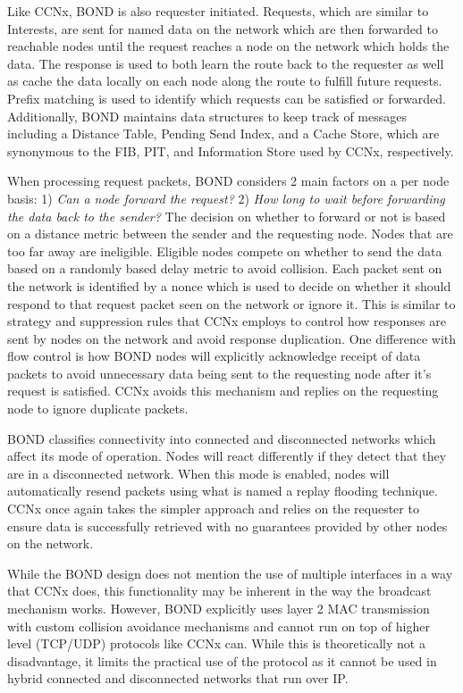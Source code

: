\documentclass[a4paper,12pt]{report}      %
\begin{document}
Like CCNx, BOND is also requester initiated. Requests, which are similar to Interests, are sent
for named data on the network which are then forwarded to reachable nodes until the request reaches a
node on the network which holds the data. The response is used to both learn the route back to the
requester as well as cache the data locally on each node along the route to fulfill future requests. Prefix
matching is used to identify which requests can be satisfied or forwarded. Additionally, BOND
maintains data structures to keep track of messages including a Distance Table, Pending Send Index,
and a Cache Store, which are synonymous to the FIB, PIT, and Information Store used by CCNx,
respectively.

When processing request packets, BOND considers 2 main factors on a per node basis: 1) \textit{Can a
node forward the request?} 2) \textit{How long to wait before forwarding the data back to the sender?} The
decision on whether to forward or not is based on a distance metric between the sender and the
requesting node. Nodes that are too far away are ineligible. Eligible nodes compete on whether to send
the data based on a randomly based delay metric to avoid collision. Each packet sent on the network is
identified by a nonce which is used to decide on whether it should respond to that request packet seen
on the network or ignore it. This is similar to strategy and suppression rules that CCNx employs to
control how responses are sent by nodes on the network and avoid response duplication. One difference
with flow control is how BOND nodes will explicitly acknowledge receipt of data packets to avoid
unnecessary data being sent to the requesting node after it's request is satisfied. CCNx avoids this
mechanism and replies on the requesting node to ignore duplicate packets.

BOND classifies connectivity into connected and disconnected networks which affect its mode
of operation. Nodes will react differently if they detect that they are in a disconnected network. When
this mode is enabled, nodes will automatically resend packets using what is named a replay flooding
technique. CCNx once again takes the simpler approach and relies on the requester to ensure data is
successfully retrieved with no guarantees provided by other nodes on the network.

While the BOND design does not mention the use of multiple interfaces in a way that CCNx
does, this functionality may be inherent in the way the broadcast mechanism works. However, BOND
explicitly uses layer 2 MAC transmission with custom collision avoidance mechanisms and cannot run
on top of higher level (TCP/UDP) protocols like CCNx can. While this is theoretically not a
disadvantage, it limits the practical use of the protocol as it cannot be used in hybrid connected and
disconnected networks that run over IP.
\end{document}
